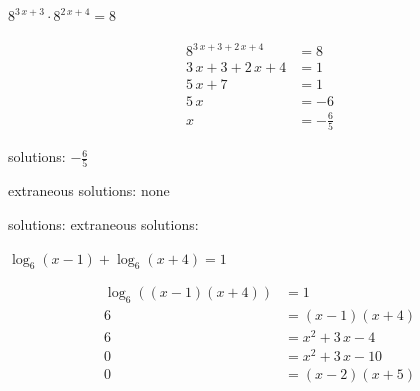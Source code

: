 \documentclass[addpoints]{exam}
\begin{document}
\begin{questions}
\newpage

\question[6] \label{exact-start}
\(\displaystyle{ 8^{3 \, x + 3} \cdot 8^{2 \, x + 4} = 8 }\)
\begin{solution}
\[\begin{aligned} 8^{3 \, x + 3+2 \, x + 4} &= 8 \\ 3 \, x + 3+2 \, x + 4 &= 1 \\ 5 \, x + 7 &= 1 \\ 5 \, x &= -6 \\ x &= -\frac{6}{5} \end{aligned}\]

solutions: \(\boxed{ -\frac{6}{5} }\)

extraneous solutions: \(\boxed{ \text{none} }\)
\end{solution}
\par solutions: \fillin[][1.5in]  extraneous solutions: \fillin[][1.5in]

\question[6] 
\(\displaystyle{ \log_{6}(x - 1) + \log_{6}(x + 4) = 1 }\)
\begin{solution}
\[\begin{aligned} \log_{6}((x - 1)(x + 4)) &= 1 \\ 6 &= (x - 1)(x + 4) \\ 6 &= x^{2} + 3 \, x - 4 \\ 0 &= x^{2} + 3 \, x - 10 \\ 0 &= (x - 2)(x + 5) \end{aligned}\]


\end{solution}
\end{questions}
\end{document}
